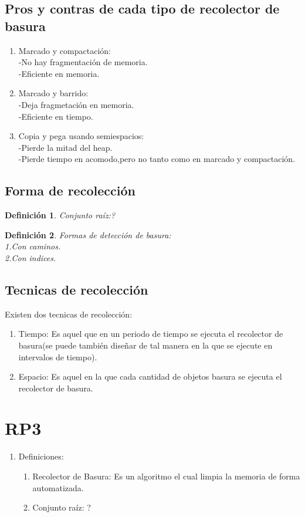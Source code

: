 \documentclass[letterpaper, 12pt]{article}
\newtheorem{definicion}{Definición}
\begin{document}
\subsection{Pros y contras de cada tipo de recolector de basura}
\begin{enumerate}
	\item Marcado y compactación:\\
	-No hay fragmentación de memoria.\\
	-Eficiente en memoria.
	\item Marcado y barrido:\\
	-Deja fragmetación en memoria.\\
	-Eficiente en tiempo.
	\item Copia y pega usando semiespacios:\\
	-Pierde la mitad del heap.\\
	-Pierde tiempo en acomodo,pero no tanto como en marcado y compactación.
\end{enumerate}

\subsection{Forma de recolección}
	\begin{definicion}
		Conjunto raíz:? 
	\end{definicion}
	\begin{definicion}
		Formas de detección de basura:\\
		1.Con caminos.\\
		2.Con indices.
	\end{definicion}

\subsection{Tecnicas de recolección}
	Existen dos tecnicas de recolección:
	\begin{enumerate}
		\item Tiempo: Es aquel que en un periodo de tiempo se ejecuta el recolector de basura(se puede también diseñar de tal manera en la que se ejecute en intervalos de tiempo).
		\item Espacio: Es aquel en la que cada cantidad de objetos basura se ejecuta el recolector de basura.
	\end{enumerate}

\section{RP3}
\begin{enumerate}
	\item Definiciones:
	\begin{enumerate}
		\item Recolector de Basura: Es un algoritmo el cual limpia la memoria de forma automatizada.
		\item Conjunto raíz: ?
	\end{enumerate}
\end{enumerate}
\end{document}
